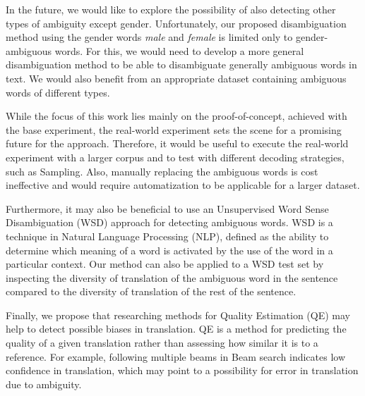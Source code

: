 In the future, we would like to explore the possibility of also detecting other types of ambiguity except gender. Unfortunately, our proposed disambiguation method using the gender words \textit{male} and \textit{female} is limited only to gender-ambiguous words. For this, we would need to develop a more general disambiguation method to be able to disambiguate generally ambiguous words in text. We would also benefit from an appropriate dataset containing ambiguous words of different types. 

While the focus of this work lies mainly on the proof-of-concept, achieved with the base experiment, the real-world experiment sets the scene for a promising future for the approach. Therefore, it would be useful to execute the real-world experiment with a larger corpus and to test with different decoding strategies, such as Sampling. Also, manually replacing the ambiguous words is cost ineffective and would require automatization to be applicable for a larger dataset.

Furthermore, it may also be beneficial to use an Unsupervised Word Sense Disambiguation (WSD) approach for detecting ambiguous words. WSD is a technique in Natural Language Processing (NLP), defined as the ability to determine which meaning of a word is activated by the use of the word in a particular context. Our method can also be applied to a WSD test set by inspecting the diversity of translation of the ambiguous word in the sentence compared to the diversity of translation of the rest of the sentence. 

Finally, we propose that researching methods for Quality Estimation (QE) may help to detect possible biases in translation. QE is a method for predicting the quality of a given translation rather than assessing how similar it is to a reference. For example, following multiple beams in Beam search indicates low confidence in translation, which may point to a possibility for error in translation due to ambiguity.

